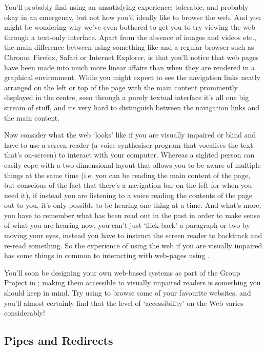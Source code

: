 You'll probably find using  an unsatisfying experience: tolerable, and probably okay in an emergency, but not how you'd ideally like to browse the web. And you might be wondering why we've even bothered to get you to try viewing the web through a text-only interface. Apart from the absence of images and videos etc., the main difference between using something like  and a regular browser such as Chrome, Firefox, Safari or Internet Explorer, is that you'll notice that web pages have been made into much more linear affairs than when they are rendered in a graphical environment. While you might expect to see the navigation links neatly arranged on the left or top of the page with the main content prominently displayed in the centre, seen through a purely textual interface it's all one big stream of stuff, and its very hard to distinguish between the navigation links and the main content. 

Now consider what the web `looks' like if you are visually impaired or blind and have to use a screen-reader (a voice-synthesiser program that vocalises the text that's on-screen) to interact with your computer. Whereas a sighted person can easily cope with a two-dimensional layout that allows you to be aware of multiple things at the same time (i.e. you can be reading the main content of the page, but conscious of the fact that there's a navigation bar on the left for when you need it), if instead you are listening to a voice reading the contents of the page out to you, it's only possible to be hearing one thing at a time. And what's more, you have to remember what has been read out in the past in order to make sense of what you are hearing now; you can't just `flick back' a paragraph or two by moving your eyes, instead you have to instruct the screen reader to backtrack and re-read something. So the experience of using the web if you are visually impaired has some things in common to interacting with web-pages using . 

You'll soon be designing your own web-based systems as part of the Group Project in ; making them accessible to visually impaired readers is something you should keep in mind. Try using  to browse some of your favourite websites, and you'll almost certainly find that the level of `accessibility' on the Web varies considerably!

\subsection{Pipes and Redirects}
\label{section:pipesandredirects}

